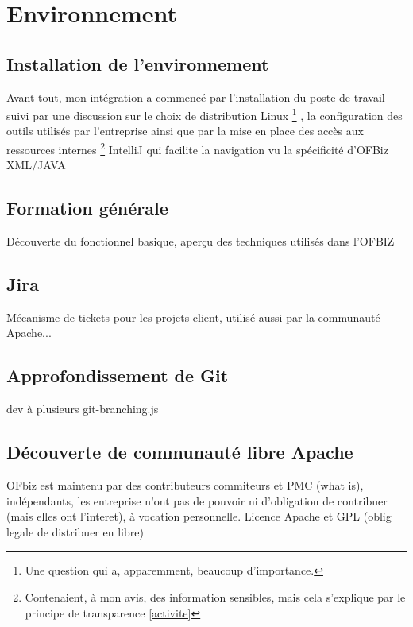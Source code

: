 \newpage









\section{Environnement}

\subsection{Installation de l'environnement}
Avant tout, mon intégration a commencé par l'installation du poste de travail suivi par une discussion sur le choix de distribution Linux \footnote{Une question qui a, apparemment, beaucoup d'importance.} , la configuration des outils utilisés par l'entreprise ainsi que par la mise en place des accès aux ressources internes \footnote{Contenaient, à mon avis, des information sensibles, mais cela s'explique par le principe de transparence \ref{activite} }
IntelliJ qui facilite la navigation vu la spécificité d'OFBiz XML/JAVA




\subsection{Formation générale}
Découverte du fonctionnel basique, aperçu des techniques utilisés dans l'OFBIZ

\subsection{Jira}
Mécanisme de tickets pour les projets client, utilisé aussi par la communauté Apache...
\subsection{Approfondissement de Git }
dev à plusieurs
git-branching.js

\subsection{Découverte de communauté libre Apache}
 OFbiz est maintenu par des contributeurs commiteurs et PMC (what is), indépendants, les entreprise n'ont pas de pouvoir ni d'obligation de contribuer (mais elles ont l'interet), à vocation personnelle. Licence Apache et GPL (oblig legale de distribuer en libre)





